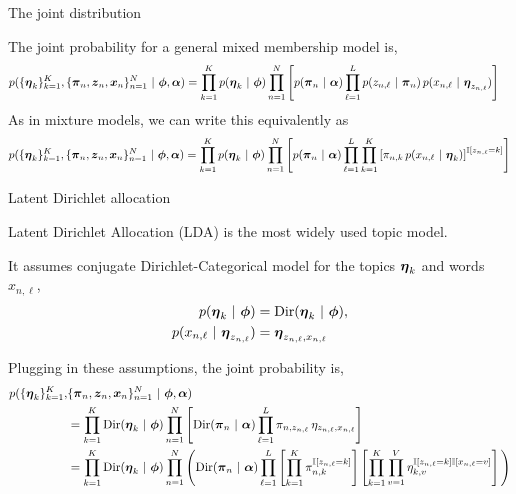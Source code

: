 \documentclass[aspectratio=169]{beamer}
\begin{document}
\begin{frame}{The joint distribution}
    
The joint probability for a general mixed membership model is,
\begin{align}
p(\{\boldsymbol{\eta}_k\}_{k=1}^K, \{\boldsymbol{\pi}_n, \boldsymbol{z}_n, \boldsymbol{x}_n\}_{n=1}^N ~\vert~ \boldsymbol{\phi}, \boldsymbol{\alpha}) 
&=
\prod_{k=1}^K p(\boldsymbol{\eta}_k ~\vert~ \boldsymbol{\phi}) 
\prod_{n=1}^N \left[ p(\boldsymbol{\pi}_n ~\vert~ \boldsymbol{\alpha}) 
\prod_{\ell=1}^L p(z_{n,\ell} ~\vert~ \boldsymbol{\pi}_n) \, p(x_{n,\ell} ~\vert~ \boldsymbol{\eta}_{z_{n,\ell}}) \right]
\end{align}
As in mixture models, we can write this equivalently as 
\begin{align}
p(\{\boldsymbol{\eta}_k\}_{k=1}^K, \{\boldsymbol{\pi}_n, \boldsymbol{z}_n, \boldsymbol{x}_n\}_{n=1}^N ~\vert~ \boldsymbol{\phi}, \boldsymbol{\alpha}) 
= 
\prod_{k=1}^K p(\boldsymbol{\eta}_k ~\vert~ \boldsymbol{\phi}) 
\prod_{n=1}^N \left[ p(\boldsymbol{\pi}_n ~\vert~ \boldsymbol{\alpha}) 
\prod_{\ell=1}^L \prod_{k=1}^K \left[\pi_{n,k} \, p(x_{n,\ell} ~\vert~ \boldsymbol{\eta}_{k})\right]^{\mathbb{I}[z_{n,\ell} = k]} \right]
\end{align}
\end{frame}


\begin{frame}[t]{Latent Dirichlet allocation}
    
Latent Dirichlet Allocation (LDA) \citep{blei2003latent} is the most widely used topic model. 

It assumes conjugate Dirichlet-Categorical model for the topics $\boldsymbol{\eta}_k$ and words $x_{n,\ell}$,
\begin{align}
    p(\boldsymbol{\eta}_k ~\vert~ \boldsymbol{\phi}) &= \mathrm{Dir}(\boldsymbol{\eta}_k ~\vert~ \boldsymbol{\phi}), \\
    p(x_{n, \ell} ~\vert~ \boldsymbol{\eta}_{z_{n,\ell}}) &= \boldsymbol{\eta}_{z_{n, \ell}, x_{n, \ell}}
\end{align}

Plugging in these assumptions, the joint probability is,
\begin{align}
p(\{\boldsymbol{\eta}_k\}_{k=1}^K, & \{\boldsymbol{\pi}_n, \boldsymbol{z}_n, \boldsymbol{x}_n\}_{n=1}^N ~\vert~ \boldsymbol{\phi}, \boldsymbol{\alpha}) \\
& = 
\label{eq:lda_joint}
\prod_{k=1}^K \mathrm{Dir}(\boldsymbol{\eta}_k ~\vert~ \boldsymbol{\phi}) 
\prod_{n=1}^N \left[ \mathrm{Dir}(\boldsymbol{\pi}_n ~\vert~ \boldsymbol{\alpha}) 
\prod_{\ell=1}^L \pi_{n,z_{n,\ell}} \, \eta_{z_{n,\ell},x_{n,\ell}} \right] \\
& = 
\prod_{k=1}^K \mathrm{Dir}(\boldsymbol{\eta}_k ~\vert~ \boldsymbol{\phi}) 
\prod_{n=1}^N \Bigg( \mathrm{Dir}(\boldsymbol{\pi}_n ~\vert~ \boldsymbol{\alpha}) 
\prod_{\ell=1}^L \left[ \prod_{k=1}^K \pi_{n,k}^{\mathbb{I}[z_{n,\ell} = k]} \right] \left[ \prod_{k=1}^K \prod_{v=1}^V \eta_{k,v}^{\mathbb{I}[z_{n,\ell}=k] \mathbb{I}[x_{n,\ell} = v]} \right] \Bigg)
\end{align}
\end{frame}
\end{document}
